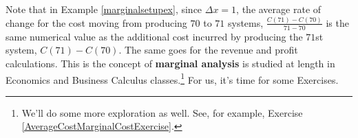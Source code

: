 \documentclass{ximera}
\begin{document}
Note that in Example \ref{marginalsetupex}, since $\Delta x = 1$, the average rate of change for the cost moving from producing $70$ to $71$ systems, $ \frac{C(71) - C(70)}{71-70}$ is the same numerical value as the additional cost incurred by producing the $71$st system,  $C(71) - C(70)$.  The same goes for the revenue and profit calculations.  This is the concept of \textbf{marginal analysis} is studied at length in Economics and Business Calculus classes.\footnote{We'll do some more exploration as well.  See, for example, Exercise \ref{AverageCostMarginalCostExercise}.}  For us, it's time for some Exercises.                       




\closegraphsfile
\end{document}
